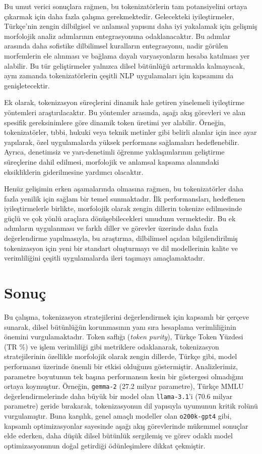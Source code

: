\documentclass{article}
\begin{document}
Bu umut verici sonuçlara rağmen, bu tokenizatörlerin tam potansiyelini ortaya çıkarmak için daha fazla çalışma gerekmektedir. Gelecekteki iyileştirmeler, Türkçe'nin zengin dilbilgisel ve anlamsal yapısını daha iyi yakalamak için gelişmiş morfolojik analiz adımlarının entegrasyonuna odaklanacaktır. Bu adımlar arasında daha sofistike dilbilimsel kuralların entegrasyonu, nadir görülen morfemlerin ele alınması ve bağlama dayalı varyasyonların hesaba katılması yer alabilir. Bu tür geliştirmeler yalnızca dilsel bütünlüğü artırmakla kalmayacak, aynı zamanda tokenizatörlerin çeşitli NLP uygulamaları için kapsamını da genişletecektir.

Ek olarak, tokenizasyon süreçlerini dinamik hale getiren yinelemeli iyileştirme yöntemleri araştırılacaktır. Bu yöntemler arasında, aşağı akış görevleri ve alan spesifik gereksinimlere göre dinamik token üretimi yer alabilir. Örneğin, tokenizatörler, tıbbi, hukuki veya teknik metinler gibi belirli alanlar için ince ayar yapılarak, özel uygulamalarda yüksek performans sağlamaları hedeflenebilir. Ayrıca, denetimsiz ve yarı-denetimli öğrenme yaklaşımlarının geliştirme süreçlerine dahil edilmesi, morfolojik ve anlamsal kapsama alanındaki eksikliklerin giderilmesine yardımcı olacaktır.

Henüz gelişimin erken aşamalarında olmasına rağmen, bu tokenizatörler daha fazla yenilik için sağlam bir temel sunmaktadır. İlk performansları, hedeflenen iyileştirmelerle birlikte, morfolojik olarak zengin dillerin tokenize edilmesinde güçlü ve çok yönlü araçlara dönüşebilecekleri umudunu vermektedir. Bu ek adımların uygulanması ve farklı diller ve görevler üzerinde daha fazla değerlendirme yapılmasıyla, bu araştırma, dilbilimsel açıdan bilgilendirilmiş tokenizasyon için yeni bir standart oluşturmayı ve dil modellerinin kalite ve verimliliğini çeşitli uygulamalarda ileri taşımayı amaçlamaktadır.

\section{Sonuç}

Bu çalışma, tokenizasyon stratejilerini değerlendirmek için kapsamlı bir çerçeve sunarak, dilsel bütünlüğün korunmasının yanı sıra hesaplama verimliliğinin önemini vurgulamaktadır. Token saflığı (\textit{token purity}), Türkçe Token Yüzdesi (TR \%) ve işlem verimliliği gibi metriklere odaklanarak, tokenizasyon stratejilerinin özellikle morfolojik olarak zengin dillerde, Türkçe gibi, model performansı üzerinde önemli bir etkisi olduğunu göstermiştir. Analizlerimiz, parametre boyutunun tek başına performansın kesin bir göstergesi olmadığını ortaya koymuştur. Örneğin, \texttt{gemma-2} (27.2 milyar parametre), Türkçe MMLU değerlendirmelerinde daha büyük bir model olan \texttt{llama-3.1}’i (70.6 milyar parametre) geride bırakarak, tokenizasyonun dil yapısıyla uyumunun kritik rolünü vurgulamıştır. Buna karşılık, genel amaçlı modeller olan \texttt{o200k-gpt4} gibi, kapsamlı optimizasyonlar sayesinde aşağı akış görevlerinde mükemmel sonuçlar elde ederken, daha düşük dilsel bütünlük sergilemiş ve görev odaklı model optimizasyonunun doğal getirdiği ödünleşimlere dikkat çekmiştir. 
\end{document}
